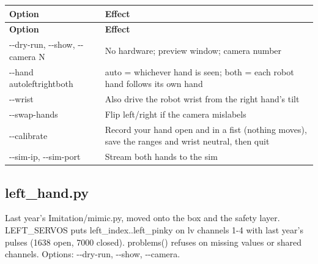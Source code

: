 \documentclass[11pt,letterpaper]{article}
\newcommand{\code}[1]{\textcolor{codeblue}{\ttfamily\smaller\relax #1}}
\begin{document}
{\small
\begin{longtable}{|>{\raggedright\arraybackslash}p{}|>{\raggedright\arraybackslash}p{}|}
\hline
\rowcolor{tblhead}\textbf{Option} & \textbf{Effect} \\ \hline
\endfirsthead
\hline
\rowcolor{tblhead}\textbf{Option} & \textbf{Effect} \\ \hline
\endhead
\code{-{}-{}dry-{}\allowbreak{}run}, \code{-{}-{}show}, \code{-{}-{}camera N} & No hardware; preview window; camera number \\ \hline
\code{-{}-{}hand auto\textbar{}left\textbar{}right\textbar{}both} & \code{auto} = whichever hand is seen; \code{both} = each robot hand follows its own hand \\ \hline
\code{-{}-{}wrist} & Also drive the robot wrist from the right hand's tilt \\ \hline
\code{-{}-{}swap-{}\allowbreak{}hands} & Flip left/right if the camera mislabels \\ \hline
\code{-{}-{}calibrate} & Record your hand open and in a fist (nothing moves), save the ranges and wrist neutral, then quit \\ \hline
\code{-{}-{}sim-{}\allowbreak{}ip}, \code{-{}-{}sim-{}\allowbreak{}port} & Stream both hands to the sim \\ \hline
\end{longtable}}


\subsection{left\_hand.py}
Last year's \code{Imitation/\allowbreak{}mimic.py}, moved onto the box and the safety layer. \code{LEFT\_\allowbreak{}SERVOS} puts \code{left\_\allowbreak{}index}..\code{left\_\allowbreak{}pinky} on \code{lv} channels 1-4 with last year's pulses (1638 open, 7000 closed). \code{problems()} refuses on missing values or shared channels. Options: \code{-{}-{}dry-{}\allowbreak{}run}, \code{-{}-{}show}, \code{-{}-{}camera}.
\end{document}
